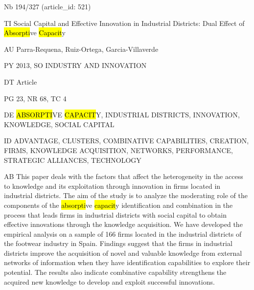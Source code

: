 \documentclass[a4paper]{article}
\begin{document}
\vspace*{-2cm}
Nb \tabto{0cm}194/327 (article\_id: 521)\par
TI \tabto{0cm}Social Capital and Effective Innovation in Industrial Districts: Dual Effect of \hl{Absorpti}ve \hl{Capacit}y\par
AU \tabto{0cm}Parra-Requena, Ruiz-Ortega, Garcia-Villaverde\par
PY \tabto{0cm}2013, SO INDUSTRY AND INNOVATION\par
DT \tabto{0cm}Article\par
PG \tabto{0cm}23, NR 68, TC 4\par
DE \tabto{0cm}\hl{ABSORPTI}VE \hl{CAPACIT}Y, INDUSTRIAL DISTRICTS, INNOVATION, KNOWLEDGE, SOCIAL CAPITAL\par
ID \tabto{0cm}ADVANTAGE, CLUSTERS, COMBINATIVE CAPABILITIES, CREATION, FIRMS, KNOWLEDGE ACQUISITION, NETWORKS, PERFORMANCE, STRATEGIC ALLIANCES, TECHNOLOGY\par
AB \tabto{0cm}This paper deals with the factors that affect the heterogeneity in the access to knowledge and its exploitation through innovation in firms located in industrial districts. The aim of the study is to analyze the moderating role of the components of the \hl{absorpti}ve \hl{capacit}y identification and combination in the process that leads firms in industrial districts with social capital to obtain effective innovations through the knowledge acquisition. We have developed the empirical analysis on a sample of 166 firms located in the industrial districts of the footwear industry in Spain. Findings suggest that the firms in industrial districts improve the acquisition of novel and valuable knowledge from external networks of information when they have identification capabilities to explore their potential. The results also indicate combinative capability strengthens the acquired new knowledge to develop and exploit successful innovations.\par
\clearpage
\end{document}
